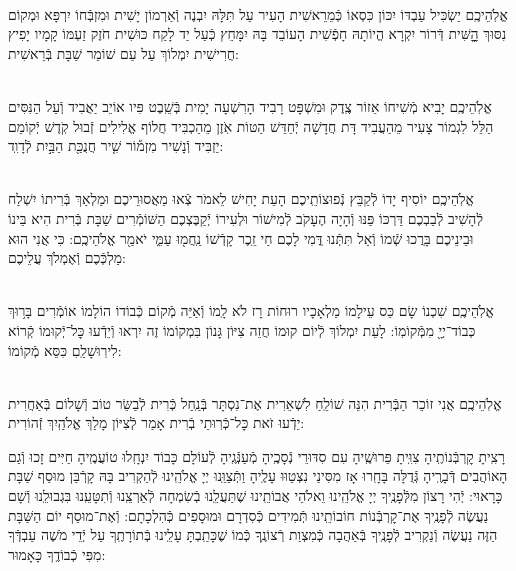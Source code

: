 \documentclass[twoside, openany, parskip=half, 11pt]{book}
\begin{document}
\begin{footnotesize}
\\
אֱלֹֽהֵיכֶֽם יַשְׂכִּיל עַבְדּוֹ יִכּוֹן כִּסְאוֹ כְּֿמֵרֵאשִׁית הָעִיר עַל תִּלָּהּ יִבְנֶה וְֿאַרְמוֹן יָשִׁית וּמִזְבְּֿחוֹ יִרְפָּא וּמְקוֹם נִסּוּךְ הׇׇׇָשִּׁית דְּֿרוֹר יִקְרָא הֱיוֹתָהּ חָפְֿשִׁית הָעוֹבֵד בָּהּ יִמָּחֵץ כְּֿעַל יַד לָקַח כּוּשִׁית חֹזֶק זַעְמּוֹ קָמָיו יָפִיץ חֲרִישִׁית יִמְלוֹךְ עַל עַם שׁוֹמֵר שַׁבָּת בְּֿרֵאשִׁית:

\\
אֱלֹֽהֵיכֶֽם יָבִיא מְֿשִׁיחוֹ אֵזוֹר צֶֽדֶק וּמִשְׁפָּט רָבִיד הָרִשְׁעָה יָמִית בְּֿשֵֽׁבֶט פִּיו אוֹיֵב יַאֲבִיד וְֿעַל הַנִּסִּים הַלֵּל לִגְמוֹר צָעִיר מֵהַעֲבִיד דָּת חֲדָשָׁה יְֿחַדֵּשׁ הַטּוֹת אֹֽזֶן מֵהַכְבִּיד חֲלוֹף אֱלִילִים זְֿבוּל קֹֽדֶשׁ יְֿקוֹמֵם יַזְבִּיד וְֿנָשִׁיר מִזְמ֡וֹר שִׁ֤יר חֲנֻכַּ֖ת הַבַּ֣יִת לְֿדָוִֽד:

\\
אֱלֹֽהֵיכֶֽם יוֹסִיף יָדוֹ לְֿקַבֵּץ נְֿפוּצוֹתֵֽיכֶם הָעֵת יָחִישׁ לֵאמֹר צְֿאוּ מֵאֲסוּרֵיכֶם וּמַלְאַךְ בְּֿרִיתוֹ יִשְׁלַח לְֿהָשִׁיב לְֿבַבְכֶם דַּרְכּוֹ פַּנּוּ וְֿהָיָה הֶעָקֹב לְֿמִישׁוֹר וּלְעִירוֹ יְֿקַבֶּצְכֶם הַשּׁוֹמְֿרִים שַׁבָּת בְּֿרִית הִיא בֵּינוֹ וּבֵינֵיכֶם בָּרֲכוּ שְֿׁמוֹ וְֿאַל תִּתְּֿנוּ דֳּמִי לָכֶם חַי זֵֽכֶר קָדְֿשׁוֹ נַֽחֲמ֖וּ עַמִּ֑י יֹאמַ֖ר אֱלֹהֵיכֶֽם: כִּי אֲנִי הוּא מַלְכְּֿכֶם וְֿאֶמְלֹךְ עֲלֵיכֶם:


\\
אֱלֹֽהֵיכֶֽם שִׁכְנוֹ שָׂם כֵּס עֵילָמוֹ מַלְאָכָיו רוּחוֹת רָז לֹא לָֽמוֹ וְֿאַיֵּה מְֿקוֹם כְּֿבוֹדוֹ הוֹלָמוֹ אוֹמְֿרִים בָּר֥וּךְ כְּבוֹד־יְיָ֖ מִמְּֿקוֹמֽוֹ: לָעֵת יִמְלוֹךְ לְֿיוֹם קוּמוֹ חֲזֵה צִיּוֹן גָּנוֹן בִּמְקוֹמוֹ זֶה יִרְאוּ וְֿיֵדְֿעוּ כׇּל־יְֿקוּמוֹ קְֿרוֹא לִירֽוּשָׁלַֽםִ כִּסֵּא מְֿקוֹמוֹ:

\\
אֱלֹֽהֵיכֶֽם אֲנִי זוֹכֵר הַבְּֿרִית הִנֵּה שׁוֹלֵֽחַ לִשְׁאֵרִית אֶת־נִסְתָּר בְּֿנַֽחַל כְּֿרִית לְֿבַשֵּׂר טוֹב וְֿשָׁלוֹם בְּֿאַחֲרִית יֵדְֿעוּ זֹאת כׇּל־כְּֿרֽוּתֵי בְֿרִית אָמַר לְֿצִיּוֹן מָלַךְ אֱלֹהַֽיִךְ זְֿהוֹרִית:

\end{footnotesize}



\sepline

\shabboskiddushhashem


רָצִֽיתָ קׇרְבְּֿנוֹתֶֽיהָ צִוִּֽיתָ פֵּרוּשֶֽׁיהָ עִם סִדּוּרֵי נְֿסָכֶֽיהָ מְֿעַנְּֿגֶֽיהָ לְֿעוֹלָם כָּבוֹד יִנְחָֽלוּ טוֹעֲמֶֽיהָ חַיִּים זָכוּ וְֿגַם הָאוֹהֲבִים דְּֿבָרֶֽיהָ גְּֿדֻלָּה בָּחָֽרוּ אָז מִסִּינַי נִצְטַוּוּ עָלֶֽיהָ
וַתְּֿצַוֵּֽנוּ יְיָ אֱלֹהֵֽינוּ לְֿהַקְרִיב בָּהּ קָרְֿבַּן מוּסַף שַׁבָּת כָּרָאוּי: יְֿהִי רָצוֹן מִלְּֿפָנֶֽיךָ יְיָ אֱלֹהֵֽינוּ וֵאלֹהֵי אֲבוֹתֵֽינוּ שֶׁתַּעֲלֵֽנוּ בְֿשִׂמְחָה לְֿאַרְצֵֽנוּ וְֿתִטָּעֵֽנוּ בִּגְבוּלֵֽנוּ וְֿשָׁם נַעֲשֶׂה לְֿפָנֶֽיךָ אֶת־קׇרְבְּֿנוֹת חוֹבוֹתֵֽינוּ תְּֿמִידִים כְּֿסִדְרָם וּמוּסָפִים כְּֿהִלְכָתָם: וְֿאֶת־מוּסַף יוֹם הַשַּׁבָּת הַזֶּה נַעֲשֶׂה וְֿנַקְרִיב לְֿפָנֶֽיךָ בְּֿאַהֲבָה כְּֿמִצְוַת רְֿצוֹנֶֽךָ כְּֿמוֹ שֶׁכָּתַֽבְתָּ עָלֵֽינוּ בְּֿתוֹרָתֶֽךָ עַל יְֿדֵי מֹשֶׁה עַבְדְּֿךָ מִפִּי כְֿבוֹדֶֽךָ כָּאָמוּר:
\end{document}
